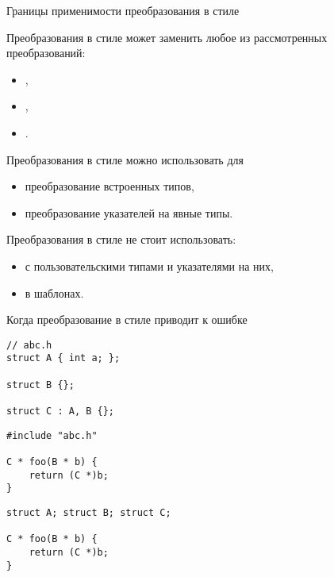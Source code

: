 \documentclass[aspectration=1610,t]{beamer}
\begin{document}
\begin{frame}[fragile]{Границы применимости преобразования в стиле \langc}{}
  \begin{itemize}
    \pitem Преобразования в стиле \langc может заменить любое из рассмотренных преобразований: 
    \begin{itemize}
        \item {},
        \item {},
        \item {}.
    \end{itemize}

    \pitem Преобразования в стиле \langc можно использовать для
    \begin{itemize}
        \item преобразование встроенных типов,
        \item преобразование указателей на явные типы.
    \end{itemize}

    \pitem Преобразования в стиле \langc не стоит использовать:
    \begin{itemize}
        \item с пользовательскими типами и указателями на них,
        \item в шаблонах.        
    \end{itemize}
  \end{itemize}
\end{frame}

\begin{frame}[fragile]{Когда преобразование в стиле \langc приводит к ошибке}{}
\begin{lstlisting}
// abc.h
struct A { int a; };

struct B {};

struct C : A, B {};
\end{lstlisting}

\pause
\begin{minipage}{.45\textwidth}
\begin{lstlisting}
#include "abc.h"

C * foo(B * b) {
    return (C *)b;
}
\end{lstlisting}


\end{minipage}\pause\hfill
\begin{minipage}{.51\textwidth}
\begin{lstlisting}
struct A; struct B; struct C;

C * foo(B * b) {
    return (C *)b;
}
\end{lstlisting}
\end{minipage}

\end{frame}
\end{document}
